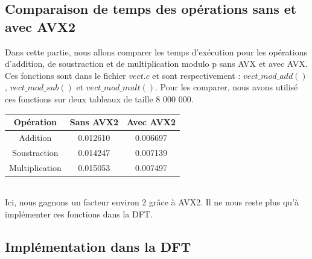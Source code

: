 \documentclass[12pt, a4paper]{article}
\begin{document}
\subsection{Comparaison de temps des opérations sans et avec AVX2}

Dans cette partie, nous allons comparer les temps d'exécution pour les opérations d'addition, de soustraction et de multiplication modulo p sans AVX et avec AVX. Ces fonctions sont dans le fichier $vect.c$ et sont respectivement :
$vect\_mod\_add()$, $vect\_mod\_sub()$ et $vect\_mod\_mult()$.
 Pour les comparer, nous avons utilisé ces fonctions sur deux tableaux de taille 8 000 000.

\begin{center}
\begin{tabular}{||c c c||}
\hline
Opération & Sans AVX2 & Avec AVX2 \\
\hline\hline
Addition & 0.012610 & 0.006697 \\
\hline
Soustraction & 0.014247 & 0.007139 \\
\hline
Multiplication & 0.015053 & 0.007497 \\
\hline
\end{tabular}
\end{center}
{}
\ \\
\indent Ici, nous gagnons un facteur environ 2 grâce à AVX2. Il ne nous reste plus qu'à implémenter ces fonctions dans la DFT.

\subsection{Implémentation dans la DFT}
\end{document}
